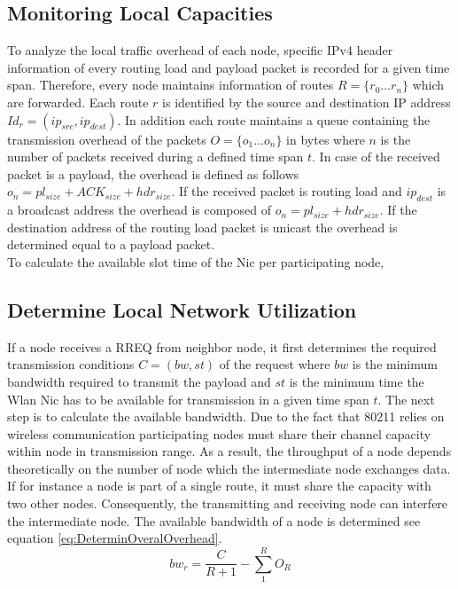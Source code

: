 \documentclass[conference]{IEEEtran}
\begin{document}
	\subsection{Monitoring Local Capacities}
	To analyze the local traffic overhead of each node, specific IPv4 header information of every routing load and payload packet is recorded for a given time span. Therefore, every node maintains information of routes $R=\{r_{0}\ldots r_{n}\}$ which are forwarded. Each route $r$ is identified by the source and destination IP address $Id_{r} = (ip_{src},ip_{dest})$. In addition each route maintains a queue containing the transmission overhead of the packets $O = \{o_{1}\ldots o_{n}\}$ in bytes where $n$ is the number of packets received during a defined time span $t$. In case of the received packet is a payload, the overhead is defined as follows $o_{n}=pl_{size} + ACK_{size}+hdr_{size}$. If the received packet is routing load and $ip_{dest}$ is a broadcast address the overhead is composed of $o_{n}=pl_{size} + hdr_{size}$. If the destination address of the routing load packet is unicast the overhead is determined equal to a payload packet.\\
	To calculate the available slot time of the Nic per participating node,  
	
	\subsection{Determine Local Network Utilization}
	If a node receives a RREQ from neighbor node, it first determines the required transmission conditions $C = (bw,st)$ of the request where $bw$ is the minimum bandwidth required to transmit the payload and $st$ is the minimum time the Wlan Nic has to be available for transmission in a given time span $t$. The next step is to calculate the available bandwidth. Due to the fact that 80211 relies on wireless communication participating nodes must share their channel capacity within node in transmission range. As a result, the throughput of a node depends theoretically on the number of node which the intermediate node exchanges data. If for instance a node is part of a single route, it must share the capacity with two other nodes. Consequently, the transmitting and receiving node can interfere the intermediate node. The available bandwidth of a node is determined see equation \ref{eq:DeterminOveralOverhead}. 
	\begin{equation}\label{eq:DeterminOveralOverhead}
		bw_{r} = \frac{C}{R+1} - \sum_{1}^{R} O_{R}
	\end{equation}
	
\end{document}
